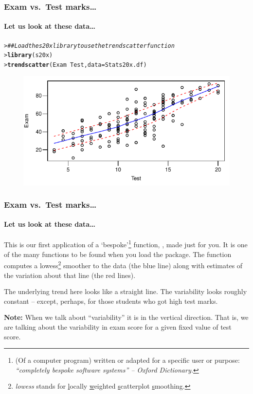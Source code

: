 \documentclass{beamer}\usepackage[]{graphicx}\usepackage[]{xcolor}
\makeatletter
\newcommand{\hlcom}[1]{\textcolor[rgb]{0.678,0.584,0.686}{\textit{#1}}}%
\newcommand{\hlopt}[1]{\textcolor[rgb]{0,0,0}{#1}}%
\newcommand{\hlstd}[1]{\textcolor[rgb]{0.345,0.345,0.345}{#1}}%
\newcommand{\hlkwc}[1]{\textcolor[rgb]{0.333,0.667,0.333}{#1}}%
\newcommand{\hlkwd}[1]{\textcolor[rgb]{0.737,0.353,0.396}{\textbf{#1}}}%
\newenvironment{kframe}{%
 \def\at@end@of@kframe{}%
 \ifinner\ifhmode%
  \def\at@end@of@kframe{\end{minipage}}%
  \begin{minipage}{\columnwidth}%
 \fi\fi%
 \def\FrameCommand##1{\hskip\@totalleftmargin \hskip-\fboxsep
 \colorbox{shadecolor}{##1}\hskip-\fboxsep
     \hskip-\linewidth \hskip-\@totalleftmargin \hskip\columnwidth}%
 \MakeFramed {\advance\hsize-\width
   \@totalleftmargin\z@ \linewidth\hsize
   \@setminipage}}%
 {\par\unskip\endMakeFramed%
 \at@end@of@kframe}
\newenvironment{knitrout}{}{} %
\makeatother
\begin{document}
\begin{frame}[fragile]
\frametitle{Exam vs.\ Test marks\ldots}
\framesubtitle{Let us look at these data\ldots}

\begin{knitrout}\scriptsize
{}\color{fgcolor}\begin{kframe}
\begin{alltt}
\hlstd{> }\hlcom{## Load the s20x library to use the trendscatter function}
\hlstd{> }\hlkwd{library}\hlstd{(s20x)}
\hlstd{> }\hlkwd{trendscatter}\hlstd{(Exam} \hlopt{~} \hlstd{Test,} \hlkwc{data} \hlstd{= Stats20x.df)}
\end{alltt}
\end{kframe}
\end{knitrout}



\begin{figure}
  \centering
  \includegraphics{figure/RC-H01-012}
\end{figure}

\end{frame}


\begin{frame}[fragile]
\frametitle{Exam vs.\ Test marks\ldots}
\framesubtitle{Let us look at these data\ldots}
This is our first application of a `bespoke'\footnote{(Of a computer program) written or adapted for a specific user or purpose: \it{``completely bespoke software systems''}  -- Oxford Dictionary.}
function, , made just for you.
It is one of the many functions to be found when you load the  package.
The  function computes a lowess\footnote{\emph{lowess} stands for \underline{l}ocally \underline{w}eighted \underline{s}catterplot \underline{s}moothing.} smoother to the data (the {\color{blue} blue} line) along with estimates of the variation about that line (the {\color{red}red} lines).

\medskip The underlying trend here looks like a straight line.
The variability looks roughly constant -- except, perhaps,
for those students who got high test marks.

{\bf Note:} When we talk about ``variability'' it is in the vertical direction.
That is, we are talking about the variability in exam score for a given fixed value
of test score.

\end{frame}
\end{document}
